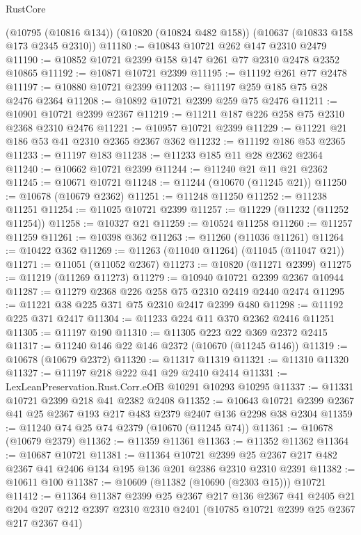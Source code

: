 \begin{lexlean}{RustCore}
\begin{coremodule}
    (@10795 (@10816 @134))
    (@10820 (@10824 @482 @158))
    (@10637 (@10833 @158 @173 @2345 @2310))
@11180 := @10843 @10721 @262 @147 @2310 @2479
@11190 := @10852 @10721 @2399 @158 @147 @261 @77 @2310 @2478 @2352 @10865
@11192 := @10871 @10721 @2399
@11195 := @11192 @261 @77 @2478
@11197 := @10880 @10721 @2399
@11203 := @11197 @259 @185 @75 @28 @2476 @2364
@11208 := @10892 @10721 @2399 @259 @75 @2476
@11211 := @10901 @10721 @2399 @2367
@11219 := @11211 @187 @226 @258 @75 @2310 @2368 @2310 @2476
@11221 := @10957 @10721 @2399
@11229 := @11221 @21 @186 @53 @41 @2310 @2365 @2367 @362
@11232 := @11192 @186 @53 @2365
@11233 := @11197 @183
@11238 := @11233 @185 @11 @28 @2362 @2364
@11240 := @10662 @10721 @2399
@11244 := @11240 @21 @11 @21 @2362
@11245 := @10671 @10721
@11248 := @11244 (@10670 (@11245 @21))
@11250 := @10678 (@10679 @2362)
@11251 := @11248 @11250
@11252 := @11238 @11251
@11254 := @11025 @10721 @2399
@11257 := @11229 (@11232 (@11252 @11254))
@11258 := @10327 @21
@11259 := @10524 @11258
@11260 := @11257 @11259
@11261 := @10398 @362
@11263 := @11260 (@11036 @11261)
@11264 := @10422 @362
@11269 := @11263 (@11040 @11264) (@11045 (@11047 @21))
@11271 := @11051 (@11052 @2367)
@11273 := @10820 (@11271 @2399)
@11275 := @11219 (@11269 @11273)
@11279 := @10940 @10721 @2399 @2367 @10944
@11287 := @11279 @2368 @226 @258 @75 @2310 @2419 @2440 @2474
@11295 := @11221 @38 @225 @371 @75 @2310 @2417 @2399 @480
@11298 := @11192 @225 @371 @2417
@11304 := @11233 @224 @11 @370 @2362 @2416 @11251
@11305 := @11197 @190
@11310 := @11305 @223 @22 @369 @2372 @2415
@11317 := @11240 @146 @22 @146 @2372 (@10670 (@11245 @146))
@11319 := @10678 (@10679 @2372)
@11320 := @11317 @11319
@11321 := @11310 @11320
@11327 := @11197 @218 @222 @41 @29 @2410 @2414
@11331 := LexLeanPreservation.Rust.Corr.eOfB @10291 @10293 @10295
@11337 := @11331 @10721 @2399 @218 @41 @2382 @2408
@11352 := @10643 @10721 @2399 @2367 @41 @25 @2367 @193 @217 @483 @2379 @2407 @136 @2298 @38 @2304
@11359 := @11240 @74 @25 @74 @2379 (@10670 (@11245 @74))
@11361 := @10678 (@10679 @2379)
@11362 := @11359 @11361
@11363 := @11352 @11362
@11364 := @10687 @10721
@11381 := @11364
    @10721
    @2399
    @25
    @2367
    @217
    @482
    @2367
    @41
    @2406
    @134
    @195
    @136
    @201
    @2386
    @2310
    @2310
    @2391
@11382 := @10611 @100
@11387 := @10609 (@11382 (@10690 (@2303 @15))) @10721
@11412 := @11364
    @11387
    @2399
    @25
    @2367
    @217
    @136
    @2367
    @41
    @2405
    @21
    @204
    @207
    @212
    @2397
    @2310
    @2310
    @2401
    (@10785 @10721 @2399 @25 @2367 @217 @2367 @41)

\end{coremodule}
\end{lexlean}
